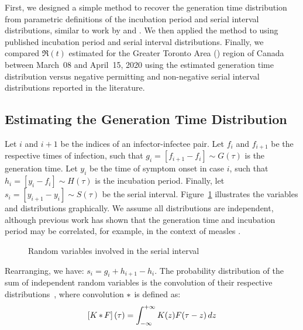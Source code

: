 First, we designed a simple method to
recover the generation time distribution
from parametric definitions of
the incubation period and serial interval distributions,
similar to work by \textcite{Kuk2005} and \textcite{Britton2019}.
We then applied the method to \covid using
published incubation period and serial interval distributions.
Finally, we compared $\Re(t)$ estimated for
the Greater Toronto Area (\gta) region of Canada
between March~08 and April~15, 2020 using
the estimated generation time distribution versus
negative permitting and non-negative serial interval distributions
reported in the literature.
\subsection{Estimating the Generation Time Distribution}
Let $i$ and $i+1$ be the indices of an infector-infectee pair.
Let $f_i$ and $f_{i+1}$ be the respective times of infection,
such that $g_i = [f_{i+1} - f_i] \sim G(\tau)$ is the generation time.
Let $y_i$ be the time of symptom onset in case $i$,
such that $h_i = [y_i - f_i] \sim H(\tau)$ is the incubation period.
Finally, let $s_i = [y_{i+1} - y_i] \sim S(\tau)$ be the serial interval.
Figure~\ref{fig:nodes} illustrates the variables and distributions graphically.
We assume all distributions are independent,
although previous work has shown that
the generation time and incubation period may be correlated,
for example, in the context of measles \cite{Klinkenberg2011}.
\par
\begin{figure}
  \centering
  
  \caption{Random variables involved in the serial interval}
  \label{fig:nodes}
\end{figure}
\par
Rearranging, we have:
$s_i = g_i + h_{i+1} - h_i$.
The probability distribution of
the sum of independent random variables
is the convolution of their respective distributions~\cite{Hogg2005},
where convolution $\mathop{\ast}$ is defined as:
\begin{equation}\label{eq:conv}
  \left[K \mathop{\ast} F\right](\tau) = \int_{-\infty}^{+\infty} K(z) F(\tau - z) \,dz
\end{equation}
